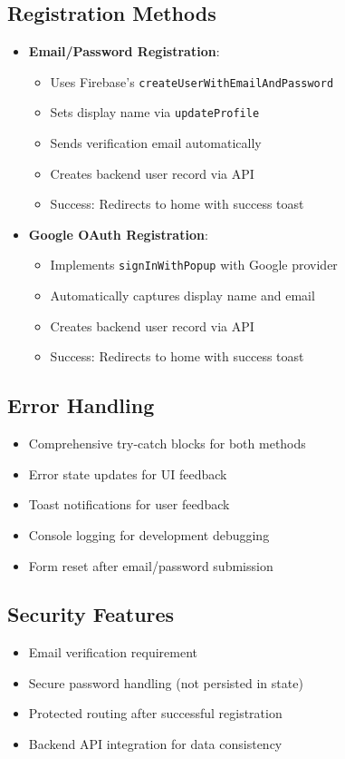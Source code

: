 \subsection{Registration Methods}
\begin{itemize}
    \item \textbf{Email/Password Registration}:
    \begin{itemize}
        \item Uses Firebase's \texttt{createUserWithEmailAndPassword}
        \item Sets display name via \texttt{updateProfile}
        \item Sends verification email automatically
        \item Creates backend user record via API
        \item Success: Redirects to home with success toast
    \end{itemize}
    
    \item \textbf{Google OAuth Registration}:
    \begin{itemize}
        \item Implements \texttt{signInWithPopup} with Google provider
        \item Automatically captures display name and email
        \item Creates backend user record via API
        \item Success: Redirects to home with success toast
    \end{itemize}
\end{itemize}

\subsection{Error Handling}
\begin{itemize}
    \item Comprehensive try-catch blocks for both methods
    \item Error state updates for UI feedback
    \item Toast notifications for user feedback
    \item Console logging for development debugging
    \item Form reset after email/password submission
\end{itemize}

\subsection{Security Features}
\begin{itemize}
    \item Email verification requirement
    \item Secure password handling (not persisted in state)
    \item Protected routing after successful registration
    \item Backend API integration for data consistency
\end{itemize}

